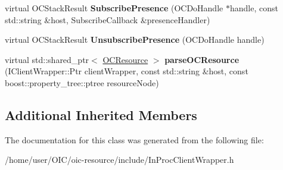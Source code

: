 \begin{DoxyCompactItemize}
\item 
\hypertarget{classOC_1_1InProcClientWrapper_a6515f00b1d0c8e1daf85e12f703851c5}{}virtual O\+C\+Stack\+Result {\bfseries Subscribe\+Presence} (O\+C\+Do\+Handle $\ast$handle, const std\+::string \&host, Subscribe\+Callback \&presence\+Handler)\label{classOC_1_1InProcClientWrapper_a6515f00b1d0c8e1daf85e12f703851c5}

\item 
\hypertarget{classOC_1_1InProcClientWrapper_adbc3490fed3f37b3d6bb1e8c24657a99}{}virtual O\+C\+Stack\+Result {\bfseries Unsubscribe\+Presence} (O\+C\+Do\+Handle handle)\label{classOC_1_1InProcClientWrapper_adbc3490fed3f37b3d6bb1e8c24657a99}

\item 
\hypertarget{classOC_1_1InProcClientWrapper_af1b68c884a253262ac297966354ffecf}{}virtual std\+::shared\+\_\+ptr$<$ \hyperlink{classOC_1_1OCResource}{O\+C\+Resource} $>$ {\bfseries parse\+O\+C\+Resource} (I\+Client\+Wrapper\+::\+Ptr client\+Wrapper, const std\+::string \&host, const boost\+::property\+\_\+tree\+::ptree resource\+Node)\label{classOC_1_1InProcClientWrapper_af1b68c884a253262ac297966354ffecf}

\end{DoxyCompactItemize}
\subsection*{Additional Inherited Members}


The documentation for this class was generated from the following file\+:\begin{DoxyCompactItemize}
\item 
/home/user/\+O\+I\+C/oic-\/resource/include/In\+Proc\+Client\+Wrapper.\+h\end{DoxyCompactItemize}
